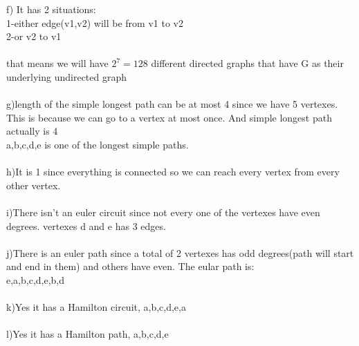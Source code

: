 \documentclass[12pt]{article}
\begin{document}
f) It has 2 situations:\\
1-either edge(v1,v2) will be from v1 to v2\\
2-or v2 to v1\\
\\
that means we will have $2^7=128$ different directed graphs that have G as their underlying undirected graph\\
\\
g)length of the simple longest path can be at most 4 since we have 5 vertexes. This is because we can go to a vertex at most once. And simple longest path actually is 4\\
a,b,c,d,e is one of the longest simple paths.\\
\\
h)It is 1 since everything is connected so we can reach every vertex from every other vertex.\\
\\
i)There isn't an euler circuit since not every one of the vertexes have even degrees. vertexes d and e has 3 edges.\\
\\
j)There is an euler path since a total of 2 vertexes has odd degrees(path will start and end in them) and others have even. The eular path is:\\ e,a,b,c,d,e,b,d\\
\\
k)Yes it has a Hamilton circuit, a,b,c,d,e,a\\
\\
l)Yes it has a Hamilton path, a,b,c,d,e\\
\end{document}
